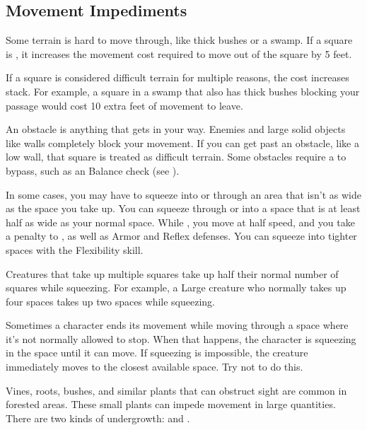     \subsection{Movement Impediments}

        \label{Difficult Terrain}
        Some terrain is hard to move through, like thick bushes or a swamp.
        If a square is , it increases the movement cost required to move out of the square by 5 feet.

        If a square is considered difficult terrain for multiple reasons, the cost increases stack.
        For example, a square in a swamp that also has thick bushes blocking your passage would cost 10 extra feet of movement to leave.

        An obstacle is anything that gets in your way. Enemies and large solid objects like walls completely block your movement. If you can get past an obstacle, like a low wall, that square is treated as difficult terrain. Some obstacles require a  to bypass, such as an Balance check (see ).

        \label{Squeezing}
        In some cases, you may have to squeeze into or through an area that isn't as wide as the space you take up.
        You can squeeze through or into a space that is at least half as wide as your normal space.
        While \squeezing, you move at half speed, and you take a  penalty to , as well as Armor and Reflex defenses.
        You can squeeze into tighter spaces with the Flexibility skill.

        Creatures that take up multiple squares take up half their normal number of squares while squeezing. For example, a Large creature who normally takes up four spaces takes up two spaces while squeezing.

         Sometimes a character ends its movement while moving through a space where it's not normally allowed to stop. When that happens, the character is squeezing in the space until it can move. If squeezing is impossible, the creature immediately moves to the closest available space. Try not to do this.

        \label{Undergrowth} Vines, roots, bushes, and similar plants that can obstruct sight are common in forested areas.
        These small plants can impede movement in large quantities.
        There are two kinds of undergrowth:  and .

